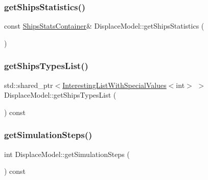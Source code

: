 \subsubsection{\texorpdfstring{getShipsStatistics()}{getShipsStatistics()}}
{\footnotesize\ttfamily const \mbox{\hyperlink{class_displace_model_a726f3fa27d4963a1cf7a396b26c64a4e}{Ships\+Stats\+Container}}\& Displace\+Model\+::get\+Ships\+Statistics (\begin{DoxyParamCaption}{ }\end{DoxyParamCaption})\hspace{0.3cm}{\ttfamily [inline]}}

\mbox{\label{class_displace_model_ab0ebc154e08b897edf68c3469319e977}} 
\subsubsection{\texorpdfstring{getShipsTypesList()}{getShipsTypesList()}}
{\footnotesize\ttfamily std\+::shared\+\_\+ptr$<$\mbox{\hyperlink{class_interesting_list_with_special_values}{Interesting\+List\+With\+Special\+Values}}$<$int$>$ $>$ Displace\+Model\+::get\+Ships\+Types\+List (\begin{DoxyParamCaption}{ }\end{DoxyParamCaption}) const\hspace{0.3cm}{\ttfamily [inline]}}

\mbox{\label{class_displace_model_a84b594669bad027277c2d37d089922b2}} 
\subsubsection{\texorpdfstring{getSimulationSteps()}{getSimulationSteps()}}
{\footnotesize\ttfamily int Displace\+Model\+::get\+Simulation\+Steps (\begin{DoxyParamCaption}{ }\end{DoxyParamCaption}) const}

\mbox{\label{class_displace_model_af6b437a1a160ca0b8b95184a95c32b11}} 
